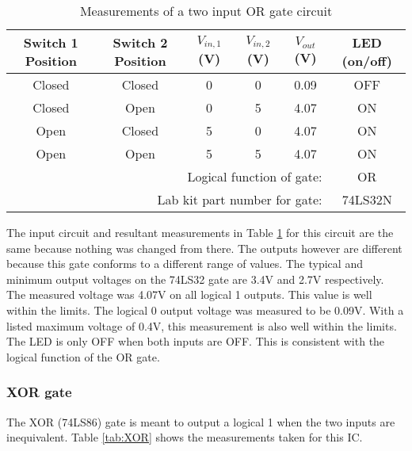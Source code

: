 \documentclass[CMPE]{KGCOEReport}
\begin{document}
\begin{table}[h]
\renewcommand{\arraystretch}{1.2}
\caption{Measurements of a two input OR gate circuit}
\begin{center}
\begin{tabular}{|c|c|c|c|c|c|}
\hline
Switch 1 Position & Switch 2 Position & $V_{in,1}$ (V) & $V_{in,2}$ (V) & $V_{out}$ (V) & LED (on/off)\\\hline

Closed & Closed & 0 & 0 & 0.09  & OFF \\\hline
Closed & Open   & 0 & 5 & 4.07  & ON \\\hline
Open   & Closed & 5 & 0 & 4.07  & ON \\\hline
Open   & Open   & 5 & 5 & 4.07 & ON \\\hline
\multicolumn{5}{|r|}{Logical function of gate: } & OR  \\\hline
\multicolumn{5}{|r|}{Lab kit part number for gate: } & 74LS32N  \\\hline

\end{tabular}
\end{center}
\label{tab:OR}
\end{table}

The input circuit and resultant measurements in Table \ref{tab:OR} for this circuit are the same because nothing was changed from there. The outputs however are different because this gate conforms to a different range of values. The typical and minimum output voltages on the 74LS32 gate are 3.4V and 2.7V respectively. The measured voltage was 4.07V on all logical 1 outputs. This value is well within the limits. The logical 0 output voltage was measured to be 0.09V. With a listed maximum voltage of 0.4V, this measurement is also well within the limits. The LED is only OFF when both inputs are OFF. This is consistent with the logical function of the OR gate.

\subsubsection{XOR gate}
The XOR (74LS86) gate is meant to output a logical 1 when the two inputs are inequivalent. Table \ref{tab:XOR} shows the measurements taken for this IC.
\end{document}
